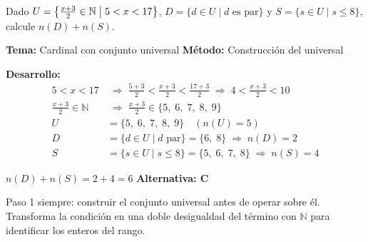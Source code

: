 \begin{tcolorbox}[
  enhanced, breakable,
  colback=GrisClaro, colframe=AzulPizarra,
  fonttitle=\bfseries\sffamily,
  title={Ejercicio 11 --- Nivel Avanzado},
  arc=3pt, boxrule=0.8pt
]
\begin{problema}
  Dado $U = \bigl\{\tfrac{x+3}{2} \in \mathbb{N} \bigm| 5 < x < 17\bigr\}$,
  $D = \{d \in U \mid d \text{ es par}\}$ y
  $S = \{s \in U \mid s \leq 8\}$, calcule $n(D) + n(S)$.
\end{problema}

\smallskip
\noindent
\textbf{\sffamily\color{AzulMedio}Tema:} Cardinal con conjunto universal
\hfill
\textbf{\sffamily\color{AzulMedio}M\'etodo:} Construcci\'on del universal

\medskip
\noindent\textbf{\sffamily Desarrollo:}
\begin{align*}
  5 < x < 17
  &\;\Rightarrow\; \frac{5+3}{2} < \frac{x+3}{2} < \frac{17+3}{2}
  \;\Rightarrow\; 4 < \frac{x+3}{2} < 10 \\[4pt]
  \frac{x+3}{2} \in \mathbb{N}
  &\;\Rightarrow\; \frac{x+3}{2} \in \{5,\;6,\;7,\;8,\;9\} \\[6pt]
  U &= \{5,\;6,\;7,\;8,\;9\} \quad (n(U)=5)\\[4pt]
  D &= \{d \in U \mid d \text{ par}\} = \{6,\;8\}
  \;\Rightarrow\; n(D)=2\\
  S &= \{s \in U \mid s \leq 8\} = \{5,\;6,\;7,\;8\}
  \;\Rightarrow\; n(S)=4
\end{align*}

\begin{tcolorbox}[
  colback=AzulClaro!60, colframe=AzulPizarra,
  arc=2pt, boxrule=0.8pt, left=8pt, right=8pt
]
\centering
$\displaystyle \boxed{n(D) + n(S) = 2 + 4 = 6}$ \quad
\textbf{Alternativa: C}
\end{tcolorbox}

\begin{cajatip}
  Paso 1 siempre: construir el conjunto universal antes de operar sobre \'el.
  Transforma la condici\'on en una doble desigualdad del t\'ermino con
  $\mathbb{N}$ para identificar los enteros del rango.
\end{cajatip}
\end{tcolorbox}

\vspace{0.5cm}

